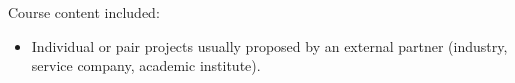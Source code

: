 Course content included:
\begin{itemize}
    \item Individual or pair projects usually proposed by an external partner (industry, service company, academic institute).
\end{itemize}